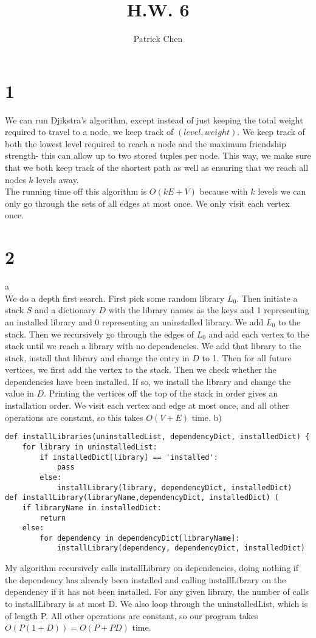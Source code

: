 \documentclass[10pt,a4paper]{article}
\title{H.W. 6}
\author{Patrick Chen}
\begin{document}
\maketitle
\tableofcontents
\section*{1}
We can run Djikstra's algorithm, except instead of just keeping the total weight required to travel to a node, we keep track of $(level, weight)$. We keep track of both the lowest level required to reach a node and the maximum friendship strength- this can allow up to two stored tuples per node. This way, we make sure that we both keep track of the shortest path as well as ensuring that we reach all nodes $k$ levels away. \\
The running time off this algorithm is $O(kE+V)$ because with $k$ levels we can only go through the sets of all edges at most once. We only visit each vertex once.
\section*{2}
a\\
We do a depth first search. First pick some random library $L_0$. Then initiate a stack $S$ and a dictionary $D$ with the library names as the keys and 1 representing an installed library and 0 representing an uninstalled library. We add $L_0$ to the stack. Then we recursively go through the edges of $L_0$ and add each vertex to the stack until we reach a library with no dependencies. We add that library to the stack, install that library and change the entry in $D$ to 1. 
Then for all future vertices, we first add the vertex to the stack. Then we check whether the dependencies have been installed. If so, we install the library and change the value in $D$. 
Printing the vertices off the top of the stack in order gives an installation order. We visit each vertex and edge at most once, and all other operations are constant, so this takes $O(V+E)$ time.
b) 
\begin{lstlisting}
def installLibraries(uninstalledList, dependencyDict, installedDict) {
	for library in uninstalledList:
		if installedDict[library] == 'installed':
			pass
		else:
			installLibrary(library, dependencyDict, installedDict)
def installLibrary(libraryName,dependencyDict, installedDict) (
	if libraryName in installedDict:
		return
	else:
		for dependency in dependencyDict[libraryName]:
			installLibrary(dependency, dependencyDict, installedDict)
\end{lstlisting}
My algorithm recursively calls installLibrary on dependencies, doing nothing if the dependency has already been installed and calling installLibrary on the dependency if it has not been installed. For any given library, the number of calls to installLibrary is at most D. We also loop through the uninstalledList, which is of length P. All other operations are constant, so our program takes $O(P(1+D))=O(P+PD)$ time.
\end{document}
